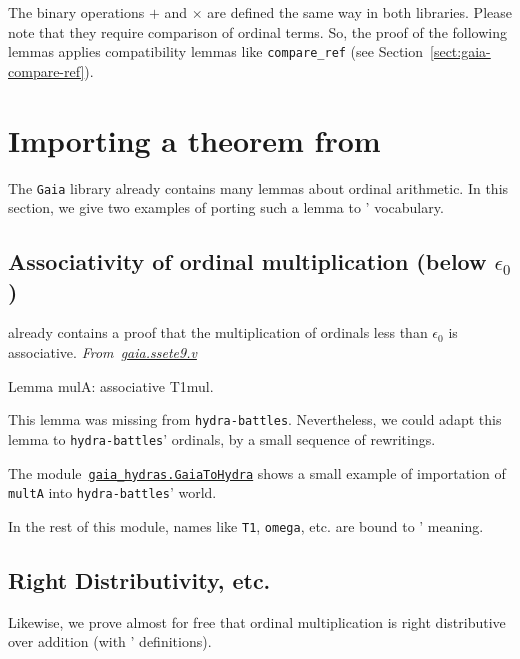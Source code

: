 The binary operations $+$ and $\times$ are defined the same way in both libraries. Please note that they require comparison of ordinal terms. So, the proof of the following lemmas applies
compatibility lemmas like \texttt{compare\_ref} (see Section~\vref{sect:gaia-compare-ref}).



\section{Importing a theorem from \gaia}
The \texttt{Gaia} library already contains many lemmas about
ordinal arithmetic. In this section, we give two examples of
porting such a lemma to \HydrasLib' vocabulary.

\subsection{Associativity of ordinal multiplication (below \texorpdfstring{$\epsilon_0$}{epsilon\_0})}
\gaia already contains a proof that the multiplication of ordinals less than $\epsilon_0$ is associative.
\emph{From~\href{https://github.com/coq-community/gaia/blob/master/theories/ssete9.v}{gaia.ssete9.v}}

\begin{Coqsrc}
Lemma mulA: associative T1mul.
\end{Coqsrc}

This lemma was missing from \texttt{hydra-battles}. Nevertheless, we could adapt this lemma to \texttt{hydra-battles}' ordinals, by a small sequence of rewritings.


The module~\href{../theories/html/gaia_hydras.GaiaToHydra.html}%
{\texttt{gaia\_hydras.GaiaToHydra}} shows a small
example of importation of \texttt{multA} into \texttt{hydra-battles}' world.


In the rest of this module, names like  \texttt{T1}, \texttt{omega}, etc. are  bound to \HydrasLib' meaning.


 \subsection{Right Distributivity, etc.}
 Likewise, we prove almost for free that ordinal multiplication is right distributive over addition (with \HydrasLib' definitions).

